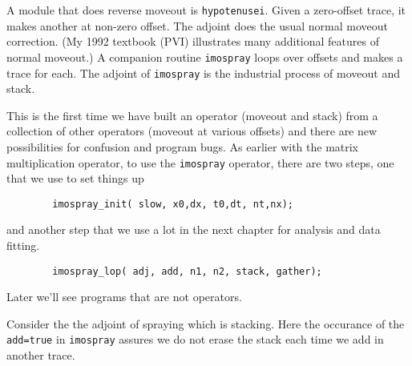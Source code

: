 \par
A module that does reverse moveout is \texttt{hypotenusei}.
Given a zero-offset trace, it makes another at non-zero offset.
The adjoint does the usual normal moveout correction.
(My 1992 textbook (PVI) illustrates many additional features of normal moveout.)
A companion routine \texttt{imospray}
loops over offsets and makes a trace for each.
The adjoint of {\tt imospray} is the industrial process of moveout and stack.

\par
This is the first time we have built an operator (moveout and stack)
from a collection of other operators (moveout at various offsets)
and there are new possibilities for confusion and program bugs.
As earlier with the matrix multiplication operator,
to use the \texttt{imospray} operator,
there are two steps, one that we use to set things up
\begin{verbatim}
        imospray_init( slow, x0,dx, t0,dt, nt,nx);
\end{verbatim}
and another step that we use a lot in the next chapter
for analysis and data fitting.
\begin{verbatim}
        imospray_lop( adj, add, n1, n2, stack, gather);
\end{verbatim}
Later we'll see programs that are not operators.
\begin{comment}
Every program that is an operator
(contains {\tt {\#}{\%} {\_}init}
      and {\tt {\#}{\%} {\_}lop})
is expanded by Loptran to a longer Fortran code
where the
      {\tt {\_}lop}
function begins by
(potentially) erasing the output (when \texttt{add=.false.}).
This
potential erasing is done in both
\texttt{hypotenusei} and
\texttt{imospray}.
\end{comment}
Consider the the adjoint of spraying which is stacking.
Here the occurance of the
\texttt{add=true} in
\texttt{imospray} assures we do not erase the stack each time
we add in another trace.
\begin{comment}
Because of Loptran we don't explicitly see that
\texttt{imospray\_lop}
has its own potential erase of its output
which we'd turn off if we wanted to add one stack upon another.
\end{comment}

